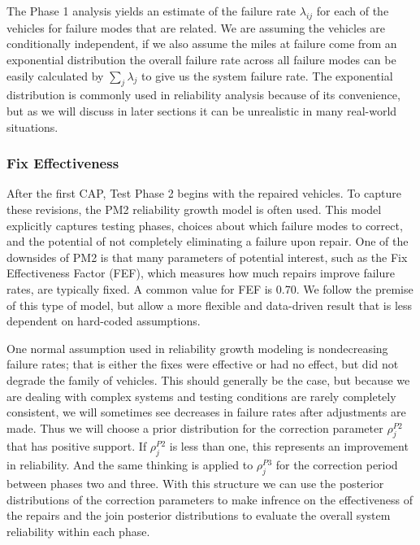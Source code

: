 \documentclass[12pt]{article}
\begin{document}
The Phase 1 analysis yields an estimate of the failure rate $\lambda_{ij}$ for
each of the vehicles for failure modes that are related.  We are assuming the
vehicles are conditionally independent, if we also assume the miles at failure
come from an exponential distribution the overall failure rate across all
failure modes can be easily calculated by $\sum_{j}\lambda_{j}$ to give us the
system failure rate.  The exponential distribution is commonly used in
reliability analysis because of its convenience, but as we will discuss in later
sections it can be unrealistic in many real-world situations.

\subsubsection{Fix Effectiveness}
After the first CAP, Test Phase 2 begins with the repaired vehicles. To capture
these revisions, the PM2 reliability growth model \cite{ref2} is often used.
This model explicitly captures testing phases, choices about which failure modes
to correct, and the potential of not completely eliminating a failure upon
repair. One of the downsides of PM2 is that many parameters of potential
interest, such as the Fix Effectiveness Factor (FEF), which measures how much
repairs improve failure rates, are typically fixed. A common value for FEF is
0.70. We follow the premise of this type of model, but allow a more flexible and
data-driven result that is less dependent on hard-coded assumptions.

One normal assumption used in reliability growth modeling is nondecreasing
failure rates; that is either the fixes were effective or had no effect, but did
not degrade the family of vehicles.  This should generally be the case, but
because we are dealing with complex systems and testing conditions are rarely
completely consistent, we will sometimes see decreases in failure rates after
adjustments are made.  Thus we will choose a prior distribution for the
correction parameter $\rho_{j}^{P2}$ that has positive support.  If
$\rho_{j}^{P2}$ is less than one, this represents an improvement in reliability.
And the same thinking is applied to $\rho_{j}^{P3}$ for the correction period
between phases two and three.  With this structure we can use the posterior
distributions of the correction parameters to make infrence on the effectiveness
of the repairs and the join posterior distributions to evaluate the overall
system reliability within each phase.
\end{document}

